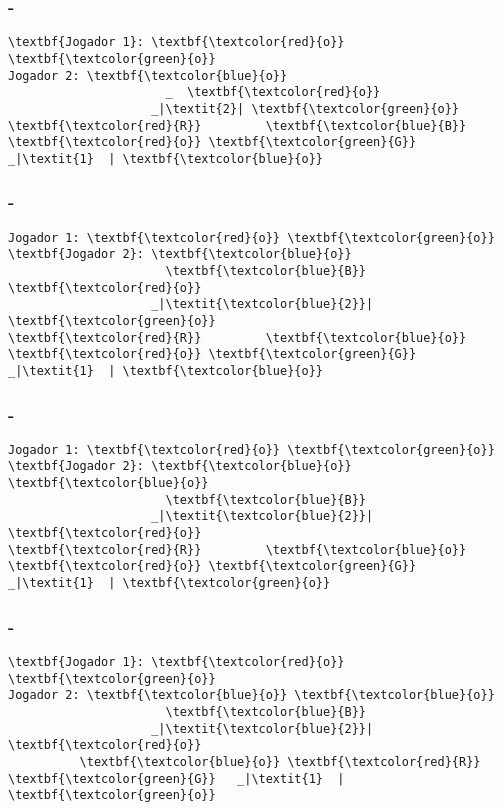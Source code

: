 \begin{frame}[fragile]
\frametitle{\secname - \subsecname}
\begin{Verbatim}[commandchars=\\\{\}]
\textbf{Jogador 1}: \textbf{\textcolor{red}{o}} \textbf{\textcolor{green}{o}}
Jogador 2: \textbf{\textcolor{blue}{o}}
                      _  \textbf{\textcolor{red}{o}}
                    _|\textit{2}| \textbf{\textcolor{green}{o}}
\textbf{\textcolor{red}{R}}         \textbf{\textcolor{blue}{B}} \textbf{\textcolor{red}{o}} \textbf{\textcolor{green}{G}}   _|\textit{1}  | \textbf{\textcolor{blue}{o}}
\end{Verbatim}
\end{frame}

\begin{frame}[fragile]
\frametitle{\secname - \subsecname}
\begin{Verbatim}[commandchars=\\\{\}]
Jogador 1: \textbf{\textcolor{red}{o}} \textbf{\textcolor{green}{o}}
\textbf{Jogador 2}: \textbf{\textcolor{blue}{o}}
                      \textbf{\textcolor{blue}{B}}  \textbf{\textcolor{red}{o}}
                    _|\textit{\textcolor{blue}{2}}| \textbf{\textcolor{green}{o}}
\textbf{\textcolor{red}{R}}         \textbf{\textcolor{blue}{o}} \textbf{\textcolor{red}{o}} \textbf{\textcolor{green}{G}}   _|\textit{1}  | \textbf{\textcolor{blue}{o}}
\end{Verbatim}
\end{frame}

\begin{frame}[fragile]
\frametitle{\secname - \subsecname}
\begin{Verbatim}[commandchars=\\\{\}]
Jogador 1: \textbf{\textcolor{red}{o}} \textbf{\textcolor{green}{o}}
\textbf{Jogador 2}: \textbf{\textcolor{blue}{o}} \textbf{\textcolor{blue}{o}}
                      \textbf{\textcolor{blue}{B}}
                    _|\textit{\textcolor{blue}{2}}| \textbf{\textcolor{red}{o}}
\textbf{\textcolor{red}{R}}         \textbf{\textcolor{blue}{o}} \textbf{\textcolor{red}{o}} \textbf{\textcolor{green}{G}}   _|\textit{1}  | \textbf{\textcolor{green}{o}}
\end{Verbatim}
\end{frame}

\begin{frame}[fragile]
\frametitle{\secname - \subsecname}
\begin{Verbatim}[commandchars=\\\{\}]
\textbf{Jogador 1}: \textbf{\textcolor{red}{o}} \textbf{\textcolor{green}{o}}
Jogador 2: \textbf{\textcolor{blue}{o}} \textbf{\textcolor{blue}{o}}
                      \textbf{\textcolor{blue}{B}}
                    _|\textit{\textcolor{blue}{2}}| \textbf{\textcolor{red}{o}}
          \textbf{\textcolor{blue}{o}} \textbf{\textcolor{red}{R}} \textbf{\textcolor{green}{G}}   _|\textit{1}  | \textbf{\textcolor{green}{o}}
\end{Verbatim}
\end{frame}

